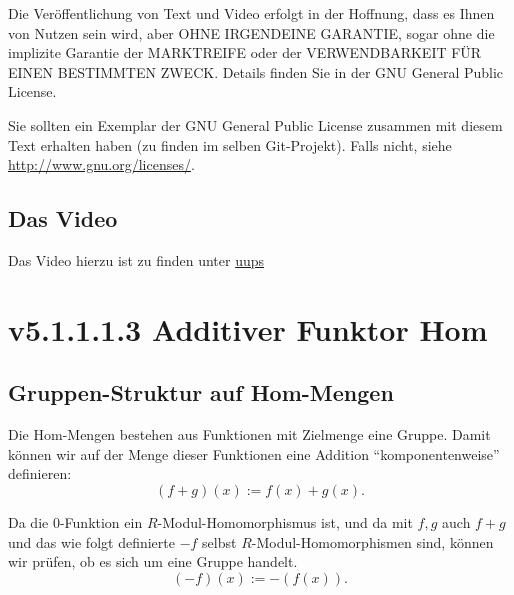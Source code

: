 \documentclass[a4paper]{amsart}
\theoremstyle{definition}
\begin{document}
Die Veröffentlichung von Text und Video erfolgt in der Hoffnung, dass es Ihnen von Nutzen sein wird,
aber OHNE IRGENDEINE GARANTIE, sogar ohne die implizite Garantie der MARKTREIFE oder der
VERWENDBARKEIT FÜR EINEN BESTIMMTEN ZWECK. Details finden Sie in der GNU General Public License.

Sie sollten ein Exemplar der GNU General Public License zusammen mit diesem Text erhalten haben
(zu finden im selben Git-Projekt).
Falls nicht, siehe \url{http://www.gnu.org/licenses/}.

\subsection*{Das Video}
Das Video hierzu ist zu finden unter
{\tiny
   \url{uups}
}

\section{v5.1.1.1.3 Additiver Funktor Hom}

\subsection{Gruppen-Struktur auf Hom-Mengen}
Die Hom-Mengen bestehen aus Funktionen mit Zielmenge eine Gruppe. Damit können wir auf der Menge dieser Funktionen eine Addition "`komponentenweise"' definieren:
\begin{equation}\label{addition}
   (f+g)(x) := f(x)+g(x).
\end{equation}

Da die $0$-Funktion ein $R$-Modul-Homomorphismus ist, und da mit $f, g$ auch $f+g$ und das wie folgt definierte $-f$ selbst $R$-Modul-Homomorphismen sind, können wir prüfen, ob es sich um eine Gruppe handelt.
\begin{equation}\label{inverses}
   (-f)(x) := -(f(x)).
\end{equation}
\end{document}
